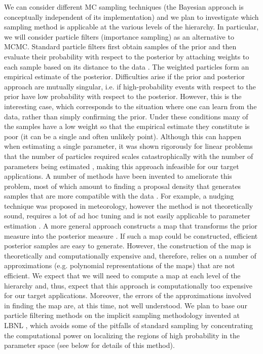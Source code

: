 \documentclass[11pt]{article}
\begin{document}
We can consider different MC sampling techniques (the Bayesian approach is conceptually independent of its implementation) and we plan to investigate which sampling method is applicable at the various levels of the hierarchy. In particular, we will consider particle filters (importance sampling) as an alternative to MCMC. Standard particle filters first obtain samples of the prior and then evaluate their probability with respect to the posterior by attaching weights to each sample based on its distance to the data \cite{Doucet2001,GordonSIR}.
The weighted particles form an empirical estimate of the posterior.
Difficulties arise if the prior and posterior approach are mutually singular, i.e. if high-probability events with respect to the prior have low probability with respect to the posterior.
However, this is the interesting case, which corresponds to the situation where one can learn from the data, rather than simply confirming the prior.
Under these conditions many of the samples have a low weight so that the empirical estimate they constitute is poor (it can be a single and often unlikely point).
Although this can happen when estimating a single parameter, it was shown rigorously for linear problems that the number of particles required scales catastrophically with the number of parameters being estimated \cite{Bickel,BickelBootstrap,Bickel2,Snyder,Weare2012,Weare2009}, making this approach infeasible for our target applications.
A number of methods have been invented to ameliorate this problem, most of which amount to finding a proposal density that  generates samples that are more compatible with the data \cite{Doucet,OptimalImportanceFunction,liuchen1995,Brad}.
For example, a nudging technique was proposed in meteorology, however the method is not theoretically sound, requires a lot of ad hoc tuning  and is not easily applicable to parameter estimation \cite{vanLeeuwen}.
A more general approach constructs a map that transforms the prior measure into the posterior measure
\cite{Moselhy2013}.  If such a map could be constructed, efficient posterior samples are easy to generate.
However, the construction of the map is theoretically and computationally expensive and, therefore, relies on a number of approximations (e.g. polynomial representations of the maps) that are not efficient.
We expect that we will need to compute a map at each level of the hierarchy and, thus, expect that this approach is computationally too expensive for our target applications. Moreover, the errors of the approximations involved in finding the map are, at this time, not well understood. We plan to base our particle filtering methods on the implicit sampling methodology invented at LBNL \cite{chorintupnas,chorin2010,Morzfeld2011,Morzfeld2012,Atkins2013}, which avoids some of the pitfalls of standard sampling by concentrating the computational power on localizing the regions of high probability in the parameter space (see below for details of this method).
\end{document}
